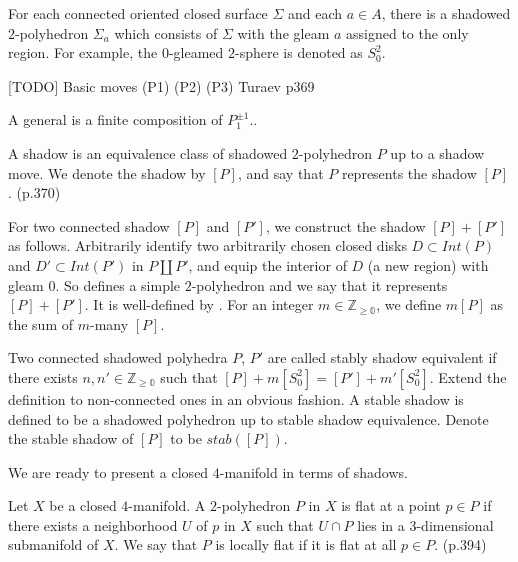 For each connected oriented closed surface $\Sigma$ and each
$a \in A$, there is a shadowed $2$-polyhedron $\Sigma_{a}$ which
consists of $\Sigma$ with the gleam $a$ assigned to the only
region. For example, the $0$-gleamed $2$-sphere is denoted as
$S^{2}_{0}$.

\begin{definition}\label{def/shadow-moves}
  [TODO]
Basic moves
  (P1)
  (P2)
  (P3)
  Turaev p369

  A general is a finite composition of $P_1^{\pm 1}$..
\end{definition}

\begin{definition}[shadow]\label{def/shadow}
  A shadow is an equivalence class of shadowed $2$-polyhedron $P$
  up to a shadow move. We denote the shadow by $[P]$, and say
  that $P$ represents the shadow $[P]$. (p.370)
\end{definition}

\noindent For two connected shadow $[P]$ and $[P']$, we construct
the shadow $[P]+[P']$ as follows. Arbitrarily identify two
arbitrarily chosen closed disks $D \subset Int(P)$ and
$D' \subset Int(P')$ in $P \coprod P'$, and equip the interior of
$D$ (a new region) with gleam $0$. So defines a simple
$2$-polyhedron and we say that it represents $[P]+[P']$. It is
well-defined by \cite[lemma VIII.2.1.1]{turaev-}. For an integer
$m \in \mathbb{Z_{\geq 0}}$, we define $m[P]$ as the sum of
$m$-many $[P]$.

\begin{definition}\label{def/stable-shadow}
  Two connected shadowed polyhedra $P$, $P'$ are called stably
  shadow equivalent if there exists
  $n, n' \in \mathbb{Z_{\geq 0}}$ such that
  $[P] + m[S^{2}_{0}] = [P'] + m'[S^{2}_{0}]$. Extend the
  definition to non-connected ones in an obvious fashion. A
  stable shadow is defined to be a shadowed polyhedron up to
  stable shadow equivalence. Denote the stable shadow of $[P]$ to
  be $stab([P])$.
\end{definition}

\noindent We are ready to present a closed $4$-manifold in terms
of shadows.

\begin{definition}\label{def/locally-flat-2-polyhedron-in-a-4-manifold}
  Let $X$ be a closed $4$-manifold. A $2$-polyhedron $P$ in $X$
  is flat at a point $p \in P$ if there exists a neighborhood $U$
  of $p$ in $X$ such that $U \cap P$ lies in a $3$-dimensional
  submanifold of $X$. We say that $P$ is locally flat if it is
  flat at all $p \in P$. (p.394)
\end{definition}

